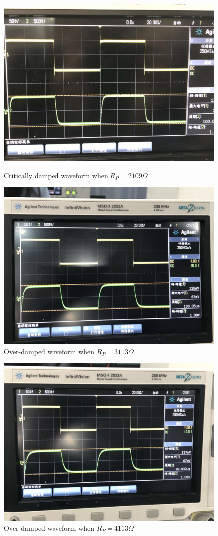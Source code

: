 \documentclass[12pt]{article}
\begin{document}
\begin{figure}[H]
\centering
\includegraphics[scale=0.2]{P3.jpg}
\caption{Critically damped waveform when $R_P=2109\Omega$}
\includegraphics[scale=0.2]{P4.jpg}
\caption{Over-damped waveform when $R_P=3113\Omega$}
\end{figure}
\begin{figure}[H]
\centering
\includegraphics[scale=0.2]{P5.jpg}
\caption{Over-damped waveform when $R_P=4113\Omega$}
\end{figure}
\end{document}

